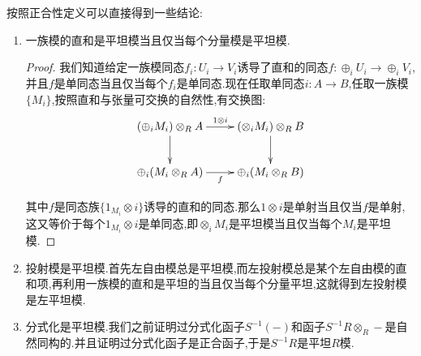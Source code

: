 按照正合性定义可以直接得到一些结论:
\begin{enumerate}
	\item 一族模的直和是平坦模当且仅当每个分量模是平坦模.
	\begin{proof}
		
		我们知道给定一族模同态$f_i:U_i\to V_i$诱导了直和的同态$f:\oplus_iU_i\to\oplus_iV_i$,并且$f$是单同态当且仅当每个$f_i$是单同态.现在任取单同态$i:A\to B$,任取一族模$\{M_i\}$,按照直和与张量可交换的自然性,有交换图:
		$$\xymatrix{(\oplus_iM_i)\otimes_RA\ar[d]\ar[r]^{1\otimes i}&(\otimes_iM_i)\otimes_RB\ar[d]\\ \oplus_i(M_i\otimes_RA)\ar[r]_f&\oplus_i(M_i\otimes_RB)}$$
		
		其中$f$是同态族$\{1_{M_i}\otimes i\}$诱导的直和的同态.那么$1\otimes i$是单射当且仅当$f$是单射,这又等价于每个$1_{M_i}\otimes i$是单同态,即$\otimes_iM_i$是平坦模当且仅当每个$M_i$是平坦模.
	\end{proof}
	\item 投射模是平坦模.首先左自由模总是平坦模,而左投射模总是某个左自由模的直和项,再利用一族模的直和是平坦的当且仅当每个分量平坦,这就得到左投射模是左平坦模.
	\item 分式化是平坦模.我们之前证明过分式化函子$S^{-1}(-)$和函子$S^{-1}R\otimes_R-$是自然同构的.并且证明过分式化函子是正合函子,于是$S^{-1}R$是平坦$R$模.
\end{enumerate}

